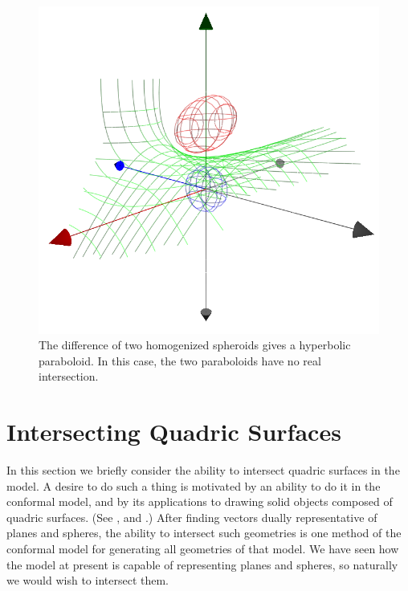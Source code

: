 \documentclass{birkjour}
\theoremstyle{definition}
\theoremstyle{remark}
\numberwithin{equation}{section}
\begin{document}
\begin{figure}
\includegraphics[scale=0.5]{DiffOfSpheroids}
\caption{The difference of two homogenized spheroids gives a hyperbolic paraboloid.
In this case, the two paraboloids have no real intersection.}
\label{fig_diff_of_spheroids}
\end{figure}

\section{Intersecting Quadric Surfaces}



In this section we briefly consider the ability to intersect quadric surfaces in the model.
A desire to do such a thing is motivated by an ability to do it in the conformal model,
and by its applications to drawing solid objects composed of quadric surfaces.  (See \cite{Levin76}, \cite{WangGoldmanTu03}
and \cite{Miller87}.)  After finding vectors dually representative of planes and spheres,
the ability to intersect such geometries is one method of the conformal model for generating
all geometries of that model.  We have seen how the model at present is capable of representing
planes and spheres, so naturally we would wish to intersect them.
\end{document}

